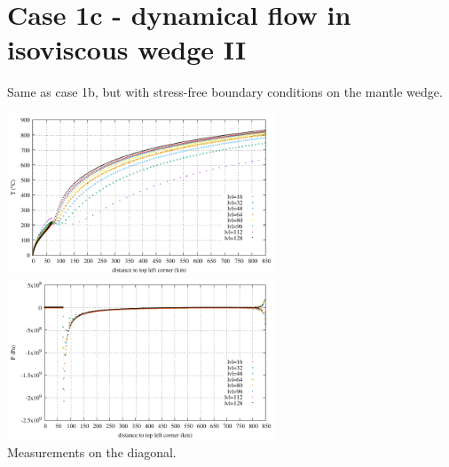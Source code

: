 \newpage
\section*{Case 1c - dynamical flow in isoviscous wedge II} 

Same as case 1b, but with stress-free boundary conditions on the mantle wedge.

\begin{center}
\includegraphics[width=8cm]{python_codes/fieldstone_149/results/case1c/diagT.pdf}
\includegraphics[width=8cm]{python_codes/fieldstone_149/results/case1c/diagP.pdf}\\
{\captionfont Measurements on the diagonal.} 
\end{center}

